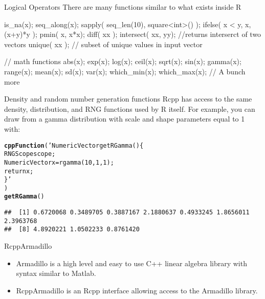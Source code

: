 \documentclass{beamer}\usepackage[]{graphicx}\usepackage[]{color}
\makeatletter
\newcommand{\hlstr}[1]{\textcolor[rgb]{0.192,0.494,0.8}{#1}}%
\newcommand{\hlstd}[1]{\textcolor[rgb]{0.345,0.345,0.345}{#1}}%
\newcommand{\hlkwd}[1]{\textcolor[rgb]{0.737,0.353,0.396}{\textbf{#1}}}%
\newenvironment{kframe}{%
 \def\at@end@of@kframe{}%
 \ifinner\ifhmode%
  \def\at@end@of@kframe{\end{minipage}}%
  \begin{minipage}{\columnwidth}%
 \fi\fi%
 \def\FrameCommand##1{\hskip\@totalleftmargin \hskip-\fboxsep
 \colorbox{shadecolor}{##1}\hskip-\fboxsep
     \hskip-\linewidth \hskip-\@totalleftmargin \hskip\columnwidth}%
 \MakeFramed {\advance\hsize-\width
   \@totalleftmargin\z@ \linewidth\hsize
   \@setminipage}}%
 {\par\unskip\endMakeFramed%
 \at@end@of@kframe}
\newenvironment{knitrout}{}{} %
\makeatother
\begin{document}
\begin{frame}[fragile]{Logical Operators}
    There are many functions similar to what exists inside R
    \begin{verbatimtab}
    is_na(x);
    seq_along(x);
    sapply( seq_len(10), square<int>() );
    ifelse( x < y, x, (x+y)*y );
    pmin( x, x*x);
    diff( xx );
    intersect( xx, yy); //returns interserct of two vectors
    unique( xx ); // subset of unique values in input vector

    // math functions
    abs(x); exp(x); log(x); ceil(x);
    sqrt(x); sin(x); gamma(x);
    range(x);
    mean(x); sd(x); var(x);
    which_min(x); which_max(x);
    // A bunch more

    \end{verbatimtab}
\end{frame}
\begin{frame}[fragile]{Density and random number generation functions}
    Rcpp has access to the same density, distribution, and RNG functions
    used by R itself. For example, you can draw from a gamma distribution with
    scale and shape parameters equal to 1 with:
\begin{knitrout}\footnotesize
{}\color{fgcolor}\begin{kframe}
\begin{alltt}
\hlkwd{cppFunction}\hlstd{(}\hlstr{'NumericVector getRGamma() \{
            RNGScope scope;
            NumericVector x = rgamma( 10, 1, 1 );
            return x;
\}'}
\hlstd{)}
\hlkwd{getRGamma}\hlstd{()}
\end{alltt}
\begin{verbatim}
##  [1] 0.6720068 0.3489705 0.3887167 2.1880637 0.4933245 1.8656011 2.3963768
##  [8] 4.8920221 1.0502233 0.8761420
\end{verbatim}
\end{kframe}
\end{knitrout}
\end{frame}
\begin{frame}[fragile]{RcppArmadillo}
    \vspace{0.5em}
    \begin{itemize}\itemsep1em
        \item Armadillo is a high level and easy to use C++ linear algebra
            library with syntax similar to Matlab.
        \item RcppArmadillo is an Rcpp interface allowing access to the
            Armadillo library.
    \end{itemize}
\end{frame}
\end{document}
